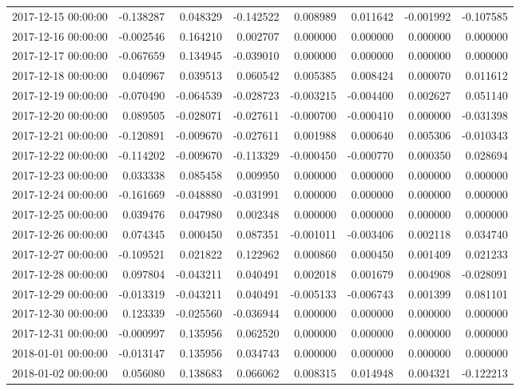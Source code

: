\begin{tabular}{lrrrrrrr}
2017-12-15 00:00:00 & -0.138287 & 0.048329 & -0.142522 & 0.008989 & 0.011642 & -0.001992 & -0.107585 \\
2017-12-16 00:00:00 & -0.002546 & 0.164210 & 0.002707 & 0.000000 & 0.000000 & 0.000000 & 0.000000 \\
2017-12-17 00:00:00 & -0.067659 & 0.134945 & -0.039010 & 0.000000 & 0.000000 & 0.000000 & 0.000000 \\
2017-12-18 00:00:00 & 0.040967 & 0.039513 & 0.060542 & 0.005385 & 0.008424 & 0.000070 & 0.011612 \\
2017-12-19 00:00:00 & -0.070490 & -0.064539 & -0.028723 & -0.003215 & -0.004400 & 0.002627 & 0.051140 \\
2017-12-20 00:00:00 & 0.089505 & -0.028071 & -0.027611 & -0.000700 & -0.000410 & 0.000000 & -0.031398 \\
2017-12-21 00:00:00 & -0.120891 & -0.009670 & -0.027611 & 0.001988 & 0.000640 & 0.005306 & -0.010343 \\
2017-12-22 00:00:00 & -0.114202 & -0.009670 & -0.113329 & -0.000450 & -0.000770 & 0.000350 & 0.028694 \\
2017-12-23 00:00:00 & 0.033338 & 0.085458 & 0.009950 & 0.000000 & 0.000000 & 0.000000 & 0.000000 \\
2017-12-24 00:00:00 & -0.161669 & -0.048880 & -0.031991 & 0.000000 & 0.000000 & 0.000000 & 0.000000 \\
2017-12-25 00:00:00 & 0.039476 & 0.047980 & 0.002348 & 0.000000 & 0.000000 & 0.000000 & 0.000000 \\
2017-12-26 00:00:00 & 0.074345 & 0.000450 & 0.087351 & -0.001011 & -0.003406 & 0.002118 & 0.034740 \\
2017-12-27 00:00:00 & -0.109521 & 0.021822 & 0.122962 & 0.000860 & 0.000450 & 0.001409 & 0.021233 \\
2017-12-28 00:00:00 & 0.097804 & -0.043211 & 0.040491 & 0.002018 & 0.001679 & 0.004908 & -0.028091 \\
2017-12-29 00:00:00 & -0.013319 & -0.043211 & 0.040491 & -0.005133 & -0.006743 & 0.001399 & 0.081101 \\
2017-12-30 00:00:00 & 0.123339 & -0.025560 & -0.036944 & 0.000000 & 0.000000 & 0.000000 & 0.000000 \\
2017-12-31 00:00:00 & -0.000997 & 0.135956 & 0.062520 & 0.000000 & 0.000000 & 0.000000 & 0.000000 \\
2018-01-01 00:00:00 & -0.013147 & 0.135956 & 0.034743 & 0.000000 & 0.000000 & 0.000000 & 0.000000 \\
2018-01-02 00:00:00 & 0.056080 & 0.138683 & 0.066062 & 0.008315 & 0.014948 & 0.004321 & -0.122213 \\

\end{tabular}

